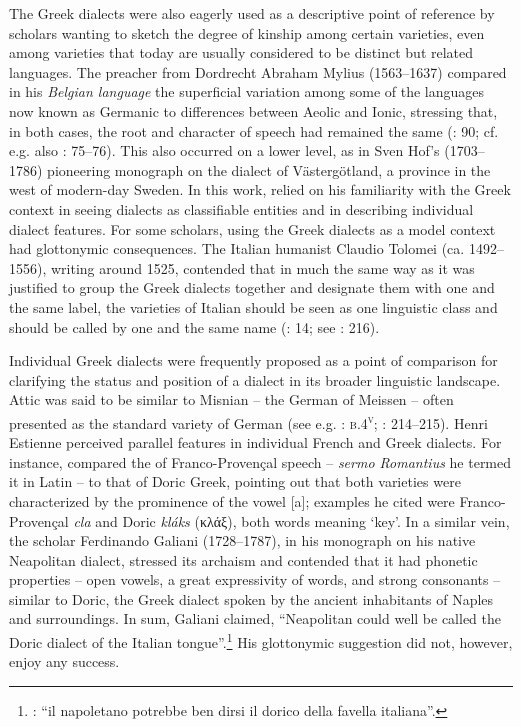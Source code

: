 The Greek dialects were also eagerly used as a descriptive point of reference by scholars wanting to sketch the degree of kinship among certain  varieties, even among varieties that today are usually considered to be distinct but related languages. The preacher from Dordrecht Abraham Mylius (1563–1637) compared in his \textit{Belgian language} the superficial variation among some of the languages now known as Germanic to differences between Aeolic and Ionic, stressing that, in both cases, the root and character of speech had remained the same (\citealt{Mylius1612}: 90; cf. e.g. also \citealt{Boxhorn1647}: 75–76). This also occurred on a lower level, as in Sven Hof’s (1703–1786) pioneering monograph on the dialect of Västergötland, a province in the west of modern-day Sweden. In this work, \citet[esp. 12–13, 23]{Hof1772} relied on his familiarity with the Greek context in seeing dialects as classifiable entities and in describing individual dialect features. For some scholars, using the Greek dialects as a model context had glottonymic consequences. The Italian humanist Claudio Tolomei (ca. 1492–1556), writing around 1525, contended that in much the same way as it was justified to group the Greek dialects together and designate them with one and the same label, the varieties of Italian should be seen as one linguistic class and should be called by one and the same name (\citealt{Tolomei1555}: 14; see \citealt{Trovato1984}: 216).

Individual Greek dialects were frequently proposed as a point of comparison for clarifying the status and position of a  dialect in its broader linguistic landscape. Attic was said to be similar to Misnian – the German of Meissen – often presented as the standard variety of German (see e.g. \citealt{Borner1705}: \textsc{b.4}\textsc{\textsuperscript{v}}; \citealt{Simonis1752}: 214–215). Henri Estienne perceived parallel features in individual French and Greek dialects. For instance, \citet[3--4]{Estienne1582} compared the  of Franco-Provençal speech – \textit{sermo Romantius} he termed it in Latin – to that of Doric Greek, pointing out that both varieties were characterized by the prominence of the vowel [a]; examples he cited were Franco-Provençal \textit{cla} and Doric \textit{kláks} (κλάξ), both words meaning ‘key’. In a similar vein, the  scholar Ferdinando Galiani (1728–1787), in his monograph on his native Neapolitan dialect, stressed its archaism and contended that it had phonetic properties – open vowels, a great expressivity of words, and strong consonants – similar to Doric, the Greek dialect spoken by the ancient inhabitants of Naples and surroundings. In sum, Galiani claimed, “Neapolitan could well be called the Doric dialect of the Italian tongue”.\footnote{\citet[16]{Galiani1779}: “il napoletano potrebbe ben dirsi il dorico della favella italiana”.} His glottonymic suggestion did not, however, enjoy any success.

